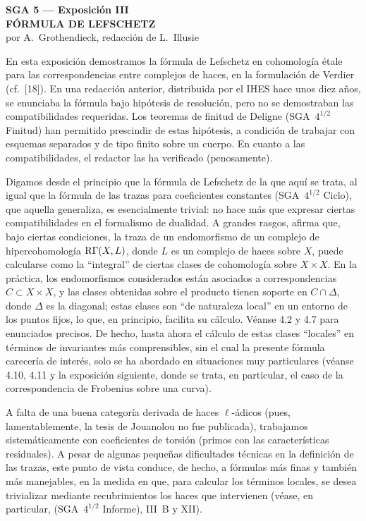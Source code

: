 \clearpage
\begin{center}
{\Large \textbf{SGA 5 --- Exposición III}}\\[0.4em]
{\large \textbf{FÓRMULA DE LEFSCHETZ}}\\[0.3em]
por A.~Grothendieck, redacción de L.~Illusie
\end{center}
\enlargethispage{-2\baselineskip}

En esta exposición demostramos la fórmula de Lefschetz en cohomología étale para las correspondencias entre complejos de haces, en la formulación de Verdier (cf.~[18]). En una redacción anterior, distribuida por el IHES hace unos diez años, se enunciaba la fórmula bajo hipótesis de resolución, pero no se demostraban las compatibilidades requeridas. Los teoremas de finitud de Deligne (SGA~$4^{1/2}$ Finitud) han permitido prescindir de estas hipótesis, a condición de trabajar con esquemas separados y de tipo finito sobre un cuerpo. En cuanto a las compatibilidades, el redactor las ha verificado (penosamente).

Digamos desde el principio que la fórmula de Lefschetz de la que aquí se trata, al igual que la fórmula de las trazas para coeficientes constantes (SGA~$4^{1/2}$ Ciclo), que aquella generaliza, es esencialmente trivial: no hace más que expresar ciertas compatibilidades en el formalismo de dualidad. A grandes rasgos, afirma que, bajo ciertas condiciones, la traza de un endomorfismo de un complejo de hipercohomología $\mathrm{R}\Gamma(X,L)$, donde $L$ es un complejo de haces sobre $X$, puede calcularse como la ``integral'' de ciertas clases de cohomología sobre $X \times X$. En la práctica, los endomorfismos considerados están asociados a correspondencias $C \subset X \times X$, y las clases obtenidas sobre el producto tienen soporte en $C \cap \Delta$, donde $\Delta$ es la diagonal; estas clases son ``de naturaleza local'' en un entorno de los puntos fijos, lo que, en principio, facilita su cálculo. Véanse 4.2 y 4.7 para enunciados precisos. De hecho, hasta ahora el cálculo de estas clases ``locales'' en términos de invariantes más comprensibles, sin el cual la presente fórmula carecería de interés, solo se ha abordado en situaciones muy particulares (véanse 4.10, 4.11 y la exposición siguiente, donde se trata, en particular, el caso de la correspondencia de Frobenius sobre una curva).

A falta de una buena categoría derivada de haces $\ell$-ádicos (pues, lamentablemente, la tesis de Jouanolou no fue publicada), trabajamos sistemáticamente con coeficientes de torsión (primos con las características residuales). A pesar de algunas pequeñas dificultades técnicas en la definición de las trazas, este punto de vista conduce, de hecho, a fórmulas más finas y también más manejables, en la medida en que, para calcular los términos locales, se desea trivializar mediante recubrimientos los haces que intervienen (véase, en particular, (SGA~$4^{1/2}$ Informe), III~B y XII).

